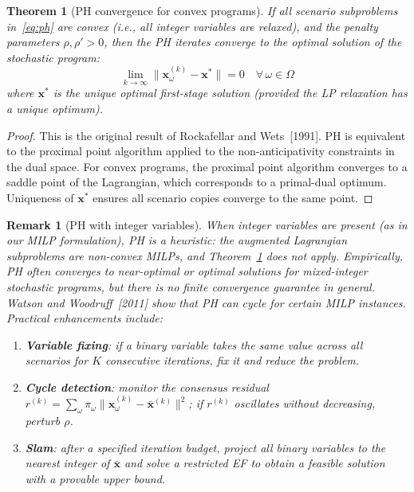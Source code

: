 \documentclass[11pt]{article}
\newtheorem{theorem}{Theorem}
\newtheorem{remark}{Remark}
\begin{document}
\begin{theorem}[PH convergence for convex programs]
\label{thm:ph-convex}
If all scenario subproblems in~\eqref{eq:ph} are convex (i.e., all
integer variables are relaxed), and the penalty parameters $\rho,
\rho' > 0$, then the PH iterates converge to the optimal solution
of the stochastic program:
\begin{equation}
  \lim_{k \to \infty}
  \|\mathbf{x}_\omega^{(k)} - \mathbf{x}^*\| = 0
  \quad \forall\, \omega \in \Omega
\end{equation}
where $\mathbf{x}^*$ is the unique optimal first-stage solution
(provided the LP relaxation has a unique optimum).
\end{theorem}

\begin{proof}
This is the original result of Rockafellar and Wets~[1991]. PH is
equivalent to the proximal point algorithm applied to the
non-anticipativity constraints in the dual space. For convex programs,
the proximal point algorithm converges to a saddle point of the
Lagrangian, which corresponds to a primal-dual optimum. Uniqueness
of $\mathbf{x}^*$ ensures all scenario copies converge to the same
point.
\end{proof}

\begin{remark}[PH with integer variables]\label{rem:ph-int}
When integer variables are present (as in our MILP formulation), PH
is a \emph{heuristic}: the augmented Lagrangian subproblems are
non-convex MILPs, and Theorem~\ref{thm:ph-convex} does not apply.
Empirically, PH often converges to near-optimal or optimal solutions
for mixed-integer stochastic programs, but there is no finite
convergence guarantee in general. Watson and Woodruff~[2011] show
that PH can cycle for certain MILP instances. Practical enhancements
include:
\begin{enumerate}[nosep]
  \item \textbf{Variable fixing}: if a binary variable takes the same
    value across all scenarios for $K$ consecutive iterations, fix it
    and reduce the problem.
  \item \textbf{Cycle detection}: monitor the consensus residual
    $r^{(k)} = \sum_\omega \pi_\omega
    \|\mathbf{x}_\omega^{(k)} - \bar{\mathbf{x}}^{(k)}\|^2$; if
    $r^{(k)}$ oscillates without decreasing, perturb $\rho$.
  \item \textbf{Slam}: after a specified iteration budget, project
    all binary variables to the nearest integer of $\bar{\mathbf{x}}$
    and solve a restricted EF to obtain a feasible solution with
    a provable upper bound.
\end{enumerate}
\end{remark}
\end{document}
